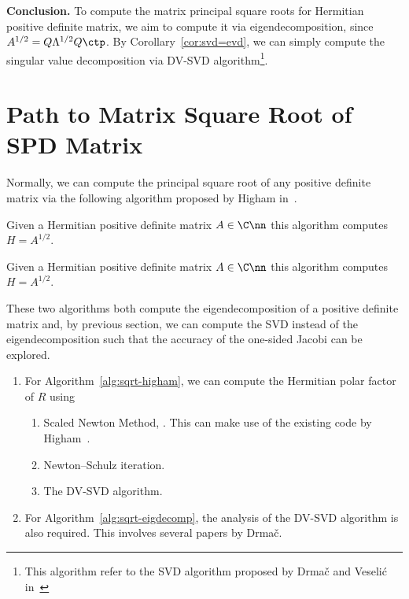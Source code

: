 \documentclass{article}
\begin{document}
\textbf{Conclusion.} To compute the matrix principal square roots for
Hermitian positive definite matrix, we aim to compute it via
eigendecomposition, since $A^{1/2} = Q\Lambda^{1/2}Q\ctp$. By
Corollary~\ref{cor:svd=evd}, we can simply compute the singular value
decomposition via DV-SVD algorithm\footnote{This algorithm refer to the SVD
  algorithm proposed by Drma{\v{c}} and Veseli{\'{c}}
  in~\cite{drve08i,drve08ii}}.

\section{Path to Matrix Square Root of SPD Matrix}
Normally, we can compute the principal square root of any positive definite
matrix via the following algorithm proposed by Higham in~.

\begin{algorithm}[h]
\caption{Given a Hermitian positive deﬁnite matrix $A\in \C\nn$ this
  algorithm computes $H = A^{1/2}$.}
\label{alg:sqrt-higham}
\begin{algorithmic}[1]
\end{algorithmic}
\end{algorithm}

\begin{algorithm}[h]
\caption{Given a Hermitian positive deﬁnite matrix $A\in \C\nn$ this
  algorithm computes $H = A^{1/2}$.}
\label{alg:sqrt-eigdecomp}
\begin{algorithmic}[1]
\end{algorithmic}
\end{algorithm}

These two algorithms both compute the eigendecomposition of a positive
definite matrix and, by previous section, we can compute the SVD instead of
the eigendecomposition such that the accuracy of the one-sided Jacobi can
be explored.

\begin{enumerate}
\item For Algorithm~\ref{alg:sqrt-higham}, we can compute the Hermitian
polar factor of $R$ using
\begin{enumerate}
\item Scaled Newton Method, . This
can make use of the existing code by Higham~\cite{high-mft}.
\item Newton--Schulz iteration.
\item The DV-SVD algorithm.
\end{enumerate}
\item For Algorithm~\ref{alg:sqrt-eigdecomp}, the analysis of the DV-SVD
algorithm is also required. This involves several papers by Drma{\v{c}}.
\end{enumerate}
\end{document}
